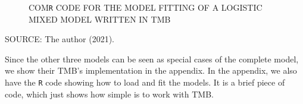 \begin{figure}[H]
 \setlength{\abovecaptionskip}{.0001pt}
 \caption{COM\texttt{R} CODE FOR THE MODEL FITTING OF A LOGISTIC MIXED
          MODEL WRITTEN IN TMB}
 \vspace{-0.4cm}
 \label{fig:completeModel}
\end{figure}


\vspace{-0.5cm}
\begin{center}
 \begin{footnotesize}
  SOURCE: The author (2021).
 \end{footnotesize}
\end{center}

Since the other three models can be seen as special cases of the
complete model, we show their TMB's implementation in the appendix. In
the appendix, we also have the \texttt{R} code showing how to load and
fit the models. It is a brief piece of code, which just shows how simple
is to work with TMB.

